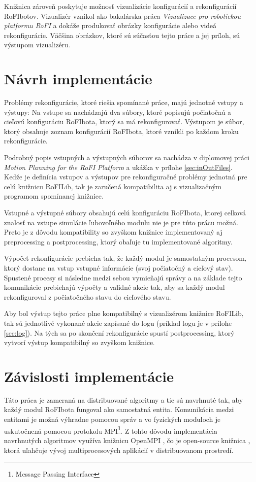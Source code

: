 \documentclass[
  printed, %
  oneside, %
  notable,   %
  nolof,     %
  nolot,     %
]{fithesis3}
\begin{document}
Knižnica zároveň poskytuje možnosť vizualizácie konfigurácií a rekonfigurácií RoFIbotov. Vizualizér vznikol ako bakalárska práca \textit{Vizualizace pro robotickou platformu RoFI} \cite{nausovaBachelorThesis} a dokáže produkovať obrázky konfigurácie alebo videá rekonfigurácie. Väčšina obrázkov, ktoré sú súčasťou tejto práce a jej príloh, sú výstupom vizualizéru. 

\section{Návrh implementácie}
Problémy rekonfigurácie, ktoré riešia spomínané práce, majú jednotné vstupy a výstupy: Na vstupe sa nachádzajú dva súbory, ktoré popisujú počiatočnú a cieľovú konfiguráciu RoFIbota, ktorý sa má rekonfigurovať. Výstupom je súbor, ktorý obsahuje zoznam konfigurácií RoFIbota, ktoré vznikli po každom kroku rekonfigurácie. 

Podrobný popis vstupných a výstupných súborov sa nachádza v diplomovej práci \textit{Motion Planning for the RoFI Platform} \cite{vozarovaMasterThesis} a ukážka v prílohe \ref{sec:inOutFiles}. Keďže je definícia vstupov a výstupov pre rekonfiguračné problémy jednotná pre celú knižnicu RoFILib, tak je zaručená kompatibilita aj s vizualizačným programom spomínanej knižnice. 

Vstupné a výstupné súbory obsahujú celú konfiguráciu RoFIbota, ktorej celková znalosť na vstupe simulácie ľubovoľného modulu nie je pre túto prácu možná. Preto je z dôvodu kompatibility so zvyškom knižnice implementovaný aj preprocessing a postprocessing, ktorý obaľuje tu implementované algoritmy. 

Výpočet rekonfigurácie prebieha tak, že každý modul je samostatným procesom, ktorý dostane na vstup vstupné informácie (svoj počiatočný a cieľový stav). Spustené procesy si následne medzi sebou vymieňajú správy a na základe tejto komunikácie prebiehajú výpočty a validné akcie tak, aby sa každý modul rekonfiguroval z počiatočného stavu do cieľového stavu. 

Aby bol výstup tejto práce plne kompatibilný s vizualizérom knižnice RoFILib, tak sú jednotlivé vykonané akcie zapísané do logu (príklad logu je v prílohe \ref{sec:log}). Na tých sa po skončení rekonfigurácie spustí postprocessing, ktorý vytvorí výstup kompatibilný so zvyškom knižnice. 

\section{Závislosti implementácie}
\label{sec:libraries}
Táto práca je zameraná na distribuované algoritmy a tie sú navrhnuté tak, aby každý modul RoFIbota fungoval ako samostatná entita. Komunikácia medzi entitami je možná výhradne pomocou správ a vo fyzických moduloch je uskutočnená pomocou protokolu MPI\footnote{Message Passing Interface}. Z tohto dôvodu implementácia navrhnutých algoritmov využíva knižnicu OpenMPI \cite{openMPILibrary}, čo je open-source knižnica \cite{openMPIGit}, ktorá uľahčuje vývoj multiprocesových aplikácií v distribuovanom prostredí. 
\end{document}
